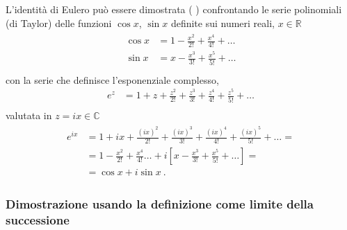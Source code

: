 \documentclass[letterpaper,10pt,italian]{jupyterBook}
\begin{document}
\sphinxAtStartPar
L’identità di Eulero può essere dimostrata ( ) confrontando le serie polinomiali (di Taylor) delle funzioni \(\cos x\), \(\sin x\) definite sui numeri reali, \(x \in \mathbb{R}\)
\begin{equation*}
\begin{split}\begin{aligned}
  \cos x & = 1 - \frac{x^2}{2!} + \frac{x^4}{4!} + \dots \\
  \sin x & = x - \frac{x^3}{3!} + \frac{x^5}{5!} + \dots \\
\end{aligned}\end{split}
\end{equation*}
\sphinxAtStartPar
con la serie che definisce l’esponenziale complesso,
\begin{equation*}
\begin{split}
  e^z & = 1 + z + \frac{z^2}{2!} + \frac{z^3}{3!} + \frac{z^4}{4!} + \frac{z^5}{5!} + \dots \\
\end{split}
\end{equation*}
\sphinxAtStartPar
valutata in \(z = i x \in \mathbb{C}\)
\begin{equation*}
\begin{split}\begin{aligned}
  e^{i x} 
      & = 1 + i x + \frac{(i x)^2}{2!} + \frac{(i x)^3}{3!} + \frac{(i x)^4}{4!} + \frac{(i x)^5}{5!} + \dots = \\
      & = 1 - \frac{x^2}{2!} + \frac{x^4}{4!} \dots + i \left[ x - \frac{x^3}{3!} + \frac{x^5}{5!}  + \dots \right] = \\
      & = \cos x + i \sin x \ .
\end{aligned}\end{split}
\end{equation*}\subsubsection*{Dimostrazione usando la definizione come limite della successione}
\end{document}

